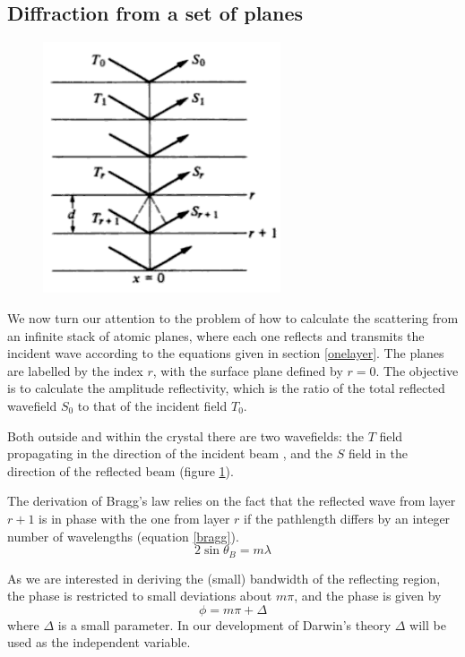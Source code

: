 \documentclass[12pt,oneside,notitlepage,abstracton,a4paper]{scrartcl}
\begin{document}
\subsection{Diffraction from a set of planes}
\begin{figure}
\vspace{-40pt}
\begin{center}
\includegraphics[width=7cm]{pics/picture3.png}
\caption{}
\label{pic3}
\end{center}
\end{figure}We now turn our attention to the problem of how to calculate the scattering from an infinite stack of atomic planes, where each one reflects and transmits the incident wave according to the equations given in section \ref{onelayer}. The planes are labelled by the index $r$, with the surface plane defined by $r=0$. The objective is to calculate the amplitude reflectivity, which is the ratio of the total reflected wavefield $S_0$ to that of the incident field $T_0$.

Both outside and within the crystal there are two wavefields: the $T$ field propagating in the direction of the incident beam , and the $S$ field in the direction of the reflected beam (figure \ref{pic3}).




The derivation of Bragg's law relies on the fact that the reflected wave from layer $r+1$ is in phase with the one from layer $r$ if the pathlength differs by an integer number of wavelengths (equation \ref{bragg}). 
\begin{equation}\label{bragg}
 2\sin{\theta_B}=m\lambda
\end{equation}

As we are interested in deriving the (small) bandwidth of the reflecting region, the phase is restricted to small deviations about $m\pi$, and the phase is given by
\begin{equation}\label{phase}
 \phi=m\pi+\Delta
\end{equation}
where $\Delta$ is a small parameter. In our development of Darwin's theory $\Delta$ will be used as the independent variable.
\end{document}
